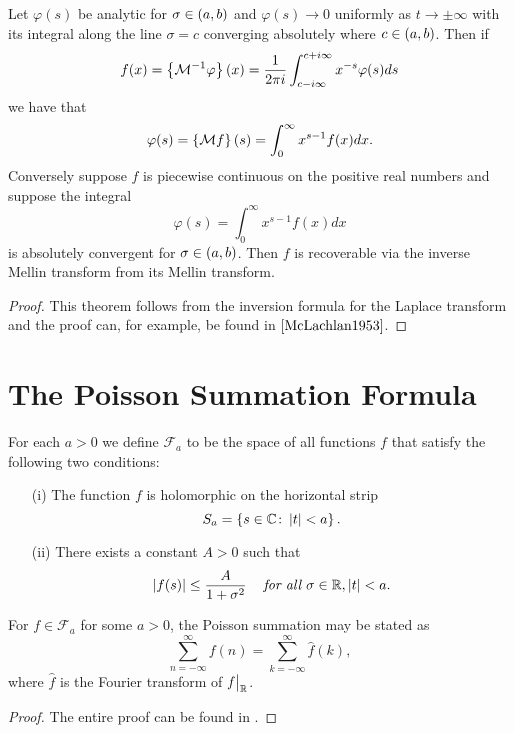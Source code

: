 \begin{theorem}
	Let $\varphi(s)$ be analytic for $\sigma \in \left(a, b\right)$ and $\varphi(s) \to 0$ uniformly as $t \to \pm\infty$ with its integral along the line $\sigma = c$ converging absolutely where $c \in \left(a, b\right)$. Then if
\begin{equation*}
	f(x) = \left\{\mathcal{M}^{-1} \varphi\right\}(x) = \frac{1}{2 \pi i} \int _{c - i \infty} ^{c + i\infty} x^{-s} \varphi(s) ds
\end{equation*}
	we have that
\begin{equation*}
	\varphi(s) = \left\{\mathcal{M} f\right\}(s) = \int _0 ^\infty x^{s - 1} f(x) dx.
\end{equation*}
	Conversely suppose $f$ is piecewise continuous on the positive real numbers and suppose the integral
\begin{equation*}
	\varphi(s) = \int _0 ^\infty x^{s - 1} f(x) dx
\end{equation*}
	is absolutely convergent for $\sigma \in \left(a, b\right)$. Then $f$ is recoverable via the inverse Mellin transform from its Mellin transform.
\end{theorem}
\begin{proof}
	This theorem follows from the inversion formula for the Laplace transform and the proof can, for example, be found in $\cite{McLachlan1953}$.
\end{proof}


\section{The Poisson Summation Formula}


\begin{definition}
	For each $a > 0$ we define $\mathcal{F}_a$ to be the space of all functions $f$ that satisfy the following two conditions:
\begin{enumerate}
	\item[(i)] The function $f$ is holomorphic on the horizontal strip
		\begin{equation*}
			S_a = \left\{s \in \mathbb{C} \colon \left|t\right| < a\right\}.
		\end{equation*}
	\item[(ii)] There exists a constant $A > 0$ such that
		\begin{equation*}
			\left|f(s)\right| \leq \frac{A}{1 + \sigma^2} \hspace{0.3cm} \textit{ for all } \sigma \in \mathbb{R}, \left|t\right| < a.
		\end{equation*}
\end{enumerate}
\end{definition}


\begin{theorem}
	For $f \in \mathcal{F}_a$ for some $a > 0$, the Poisson summation may be stated as
\begin{equation*}
	\sum _{n = -\infty} ^\infty f(n) = \sum _{k = -\infty} ^\infty \hat{f}(k),
\end{equation*}
	where $\hat{f}$ is the Fourier transform of $f \big\vert _{\mathbb{R}}$.
\end{theorem}
\begin{proof}
	The entire proof can be found in \cite{Stein2003}.
\end{proof}